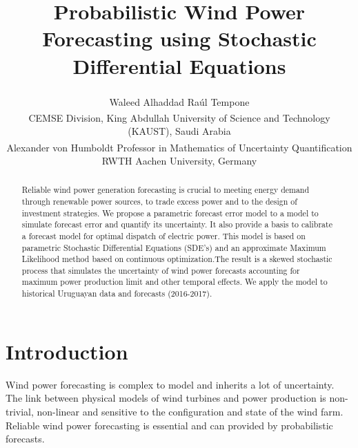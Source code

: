 \documentclass[10pt,twocolumn,letterpaper]{article}
\begin{document}
\title{ Probabilistic Wind Power Forecasting using Stochastic Differential Equations }  %

\author{ Waleed Alhaddad\textsuperscript{\textasteriskcentered} \qquad Ra\'ul  Tempone\textsuperscript{\textasteriskcentered}\textsuperscript{\textdagger} \\
\textsuperscript{\textasteriskcentered}CEMSE Division, King Abdullah University of Science and Technology (KAUST), Saudi Arabia \\ \textsuperscript{\textdagger}Alexander von Humboldt Professor in Mathematics of Uncertainty Quantification\\ RWTH Aachen University,  Germany
}

\maketitle


\begin{abstract}
Reliable wind power generation forecasting is crucial to meeting energy demand through renewable power sources, to trade excess power and to the design of investment strategies. We propose a parametric forecast error model to a model to simulate forecast error and quantify its uncertainty. It also provide a basis to calibrate a forecast model for  optimal dispatch of electric power. This model is based on parametric Stochastic Differential Equations (SDE's) and an approximate Maximum Likelihood method based on continuous optimization.The result is a skewed stochastic process that simulates the uncertainty of wind power forecasts accounting for maximum power production limit and other temporal effects. We apply the model to historical Uruguayan data and forecasts (2016-2017).



\end{abstract}

\section{Introduction}
	Wind power forecasting is complex to model and inherits a lot of uncertainty. The link between physical models of  wind turbines  and power production is non-trivial, non-linear and sensitive to the configuration and state of the wind farm. Reliable wind power forecasting is essential and can provided by probabilistic forecasts.
\end{document}
